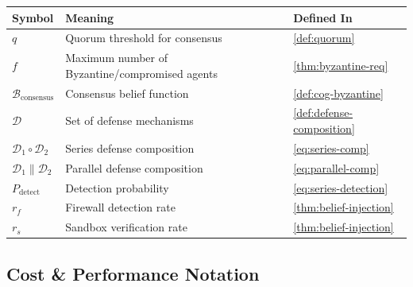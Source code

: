 \documentclass[
]{article}
\newcounter{none} %
\begin{document}
{\def\LTcaptype{none} %
\begin{longtable}[]{@{}
  >{\raggedright\arraybackslash}p{}
  >{\raggedright\arraybackslash}p{}
  >{\raggedright\arraybackslash}p{}@{}}
\toprule\noalign{}
\begin{minipage}[b]{\linewidth}\raggedright
Symbol
\end{minipage} & \begin{minipage}[b]{\linewidth}\raggedright
Meaning
\end{minipage} & \begin{minipage}[b]{\linewidth}\raggedright
Defined In
\end{minipage} \\
\midrule\noalign{}
\endhead
\bottomrule\noalign{}
\endlastfoot
\(q\) & Quorum threshold for consensus & \cref{def:quorum} \\
\(f\) & Maximum number of Byzantine/compromised agents &
\cref{thm:byzantine-req} \\
\(\mathcal{B}_{\text{consensus}}\) & Consensus belief function &
\cref{def:cog-byzantine} \\
\(\mathcal{D}\) & Set of defense mechanisms &
\cref{def:defense-composition} \\
\(\mathcal{D}_1 \circ \mathcal{D}_2\) & Series defense composition &
\cref{eq:series-comp} \\
\(\mathcal{D}_1 \parallel \mathcal{D}_2\) & Parallel defense composition
& \cref{eq:parallel-comp} \\
\(P_{\text{detect}}\) & Detection probability &
\cref{eq:series-detection} \\
\(r_f\) & Firewall detection rate & \cref{thm:belief-injection} \\
\(r_s\) & Sandbox verification rate & \cref{thm:belief-injection} \\
\end{longtable}
}

\subsection{Cost \& Performance
Notation}\label{cost-performance-notation}
\end{document}
